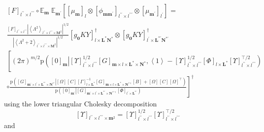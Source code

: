 \documentclass[preprint,12pt]{elsarticle}
\newcommand*{\M}[1]{\ensuremath{#1}\xspace}
\newcommand*{\x}{\times}
\newcommand*{\mi}[1]{\mathbf{#1}}
\newcommand*{\te}[2][]{\left\lbrack{#2}\right\rbrack_{#1}}
\newcommand*{\diag}[2][]{\left\langle{#2}\right\rangle_{#1}}
\newcommand*{\prob}[3]{\M{\mathrm{p}\!\left(\left.{#1}\right\vert{#2,#3}\right)}}
\newcommand*{\evt}[3][]{\mathbb{E}_{#3}^{#1}\!#2}
\newcommand*{\modulus}[1]{\M{\left\lvert{#1}\right\rvert}}
\begin{document}
        \begin{multline*}
            \te[l^{\prime\prime}\x l^{\prime\prime\prime}]{F} \circ \evt{\;\evt{\te[]{\te[l]{\mu_{\mi{m}}} \otimes \te[l^{\prime\prime}\x l^{\prime\prime\prime}]{\phi_{\mi{mm^{\prime}}}} \otimes \te[l^{\prime}]{\mu_{\mi{m^{\prime}}}}}}{\mi{m^{\prime}}}}{\mi{m}} = \\
             \frac {\te[l^{\prime\prime}\x l^{\prime\prime\prime}]{F}
            \modulus{\diag[l^{\prime\prime}\x l^{\prime\prime\prime}\x\mi{M}^{2}]{\Lambda^{2}}}^{1/2}}
            {\modulus{\diag[l^{\prime\prime}\x l^{\prime\prime\prime}\x\mi{M}^2]{\Lambda^{2}+2}}^{1/2}}
            \te[l\x\mi{L^{*}N^{*}}]{g_{\mi{0}}KY}^{\dagger} \otimes
            \te[l^{\prime}\x\mi{L^{*\prime}N^{*\prime}}]{g_{\mi{0}}KY}^{\dagger} \\
            \left\lbrack (2\pi)^{m/2}
            \prob{\te[\mi{m}]{0}}{\te[l^{\prime\prime}\x l^{\prime\prime\prime}]{\Upsilon}^{1/2} \te[\mi{m}\x l\x \mi{L^{*}\x N^{*}}]{G}} 
            {\diag[]{1} -
            \te[l^{\prime\prime}\x l^{\prime\prime\prime}]{\Upsilon}^{1/2} \te[l\x \mi{L^{*}}]{\Phi}\te[l^{\prime\prime}\x l^{\prime\prime\prime}]{\Upsilon}^{\intercal/2}} \phantom{\frac{_{\vert}^{\vert}}{_{\vert}^{\vert}}} \right.\\
            \left. \circ 
                \frac{
                    \prob{\te[\mi{m^{\prime}}\x l^{\prime}\x \mi{L^{*\prime}\x N^{*\prime}}]{G}}
                    {\te[]{\Omega} \te[]{C} \te[l\x \mi{L^{*}}]{\Gamma}^{-1} \te[\mi{m}\x l\x \mi{L^{*}\x N^{*}}]{G}}{\te[]{B}+\te[]{\Omega} \te[]{C} \te[]{\Omega}^{\intercal}}}
                    {\prob{\te[\mi{m^{\prime}}]{0}}{\te[\mi{m^{\prime}}\x l^{\prime}\x \mi{L^{*\prime}\x N^{*\prime}}]{G}}{\te[l^{\prime}\x \mi{L^{*\prime}}]{\Phi}}}
            \right\rbrack^{\dagger}
        \end{multline*}
        using the lower triangular Cholesky decomposition
        \begin{equation*}
            \te[l^{\prime\prime}\x l^{\prime\prime\prime}\x\mi{m}^{2}]{\Upsilon}
            = \te[l^{\prime\prime}\x l^{\prime\prime\prime}]{\Upsilon}^{1/2} \te[l^{\prime\prime}\x l^{\prime\prime\prime}]{\Upsilon}^{\intercal/2}
        \end{equation*}
        and
\end{document}

